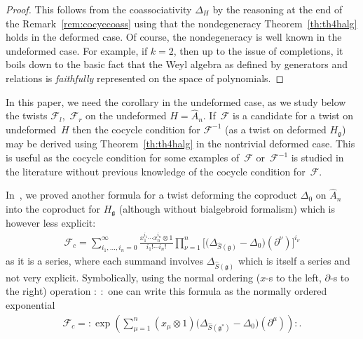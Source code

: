 \documentclass[pdftex]{sigma}
\def\gg{\mathfrak{g}}
\numberwithin{equation}{section}
\begin{document}
\begin{proof}This follows from the coassociativity $\Delta_H$ by the reasoning at the end of the Remark~\ref{rem:cocyccoass} using that the nondegeneracy Theorem~\ref{th:th4halg} holds in the deformed case. Of course, the nondegeneracy is well known in the undeformed case. For example, if $k=2$, then up to the issue of completions, it boils down to the basic fact that the Weyl algebra as defined by generators and relations is {\em faithfully} represented on the space of polynomials.
\end{proof}

In this paper, we need the corollary in the undeformed case, as we study below the twists $\mathcal{F}_l$,~$\mathcal{F}_r$ on the undeformed $H = \hat{A}_n$. If~$\mathcal{F}$ is a candidate for a twist on undeformed~$H$ then the cocycle condition for $\mathcal{F}^{-1}$ (as a twist on deformed $H_\gg$) may be derived using Theorem~\ref{th:th4halg} in the nontrivial deformed case. This is useful as the cocycle condition for some examples of~$\mathcal{F}$ or~$\mathcal{F}^{-1}$ is studied in the literature without previous knowledge of the cocycle condition for~$\mathcal{F}$.

In~\cite{scopr}, we proved another formula for a twist deforming the coproduct $\Delta_0$ on $\hat{A}_n$ into the coproduct for $H_\gg$ (although without bialgebroid formalism) which is however less explicit:
\begin{gather}\label{eq:Fc}
\mathcal{F}_c = \sum_{i_1,\dots,i_n = 0}^\infty \frac{x_1^{i_1}\cdots x_n^{i_n}\otimes 1}{i_1!\cdots i_n!}\prod_{\nu = 1}^n\big[\big(\Delta_{\hat{S}(\gg)} - \Delta_0\big)(\partial^\nu)\big]^{i_\nu}
\end{gather}
as it is a series, where each summand involves $\Delta_{\hat{S}(\gg)}$ which is itself a series and not very explicit. Symbolically, using the normal ordering ($x$-s to the left, $\partial$-s to the right) operation ${:} \ {:}$ one can write this formula as the normally ordered exponential \begin{gather*}
\mathcal{F}_c = {:}\exp\left(\sum_{\mu = 1}^n (x_\mu\otimes 1)\big(\Delta_{\hat{S}(\gg^*)}-\Delta_0\big)(\partial^\mu)\right){:}.
\end{gather*}
\end{document}
